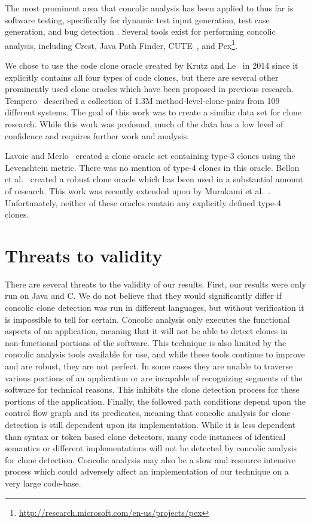 \documentclass{sig-alternate}
\begin{document}
The most prominent area that concolic analysis has been applied to thus far is software testing, specifically for dynamic test input generation, test case generation, and bug detection \cite{Wassermann:2008:DTI:1390630.1390661, Sen:2005:CCU:1081706.1081750}. Several tools exist for performing concolic analysis, including Crest, Java Path Finder, CUTE~\cite{Sen:2005:CCU:1081706.1081750}, and Pex\footnote{\url{http://research.microsoft.com/en-us/projects/pex}}.

We chose to use the code clone oracle created by Krutz and Le~\cite{Krutz:2014:CCO:2597073.2597127} in 2014 since it explicitly contains all four types of code clones, but there are several other prominently used clone oracles which have been proposed in previous research. Tempero~\cite{IWSC13p53} described a collection of 1.3M method-level-clone-pairs from 109 different systems. The goal of this work was to create a similar data set for clone research. While this work was profound, much of the data has a low level of confidence and requires further work and analysis.

Lavoie and Merlo~\cite{Lavoie:2011:ATC:1985404.1985411} created a clone oracle set containing type-3 clones using the Levenshtein metric. There was no mention of type-4 clones in this oracle. Bellon et al.~\cite{4288192} created a robust clone oracle which has been used in a substantial amount of research. This work was recently extended upon by Murakami et al.~\cite{Murakami:2014:DCR:2597073.2597133}. Unfortunately, neither of these oracles contain any explicitly defined type-4 clones.


\section{Threats to validity}
\label{sec: threats}
There are several threats to the validity of our results. First, our results were only run on Java and C. We do not believe that they would significantly differ if concolic clone detection was run in different languages, but without verification it is impossible to tell for certain. Concolic analysis only executes the functional aspects of an application, meaning that it will not be able to detect clones in non-functional portions of the software. This technique is also limited by the concolic analysis tools available for use, and while these tools continue to improve and are robust, they are not perfect. In some cases they are unable to traverse various portions of an application or are incapable of recognizing segments of the software for technical reasons. This inhibits the clone detection process for these portions of the application. Finally, the followed path conditions depend upon the control flow graph and its predicates, meaning that concolic analysis for clone detection is still dependent upon its implementation. While it is less dependent than syntax or token based clone detectors, many code instances of identical semantics or different implementations will not be detected by concolic analysis for clone detection. Concolic analysis may also be a slow and resource intensive process which could adversely affect an implementation of our technique on a very large code-base.
\end{document}
